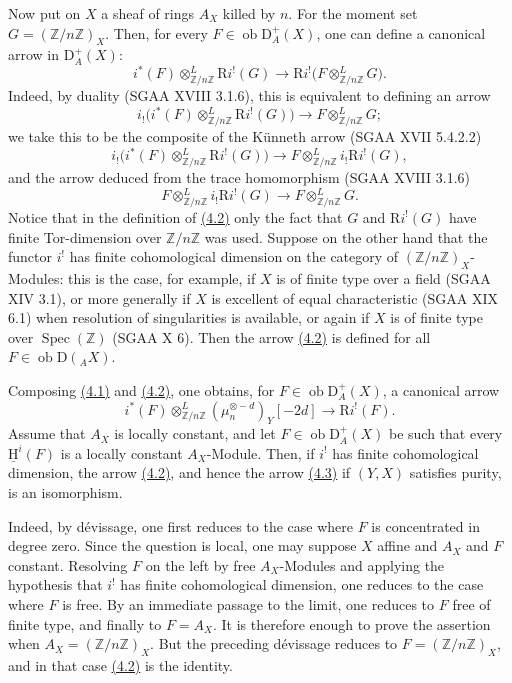 \documentclass[11pt]{article}
\providecommand{\uH}{\underline{\mathrm H}}
\DeclareMathOperator{\Spec}{Spec}
\newcommand{\R}{\mathrm{R}}
\newcommand{\D}{\mathrm{D}}
\newcommand{\Z}{\mathbb{Z}}
\newcommand{\ob}{\operatorname{ob}}
\providecommand{\ob}{\operatorname{ob}}
\providecommand{\R}{\mathrm R}
\providecommand{\Z}{\mathbb Z}
\providecommand{\Spec}{\operatorname{Spec}}
\providecommand{\Spec}{\operatorname{Spec}}
\providecommand{\Spec}{\operatorname{Spec}}
\providecommand{\Spec}{\operatorname{Spec}}
\begin{document}
Now put on $X$ a sheaf of rings $A_X$ killed by $n$. For the moment set $G=(\Z/n\Z)_X$. Then, for every $F\in\ob\D_A^+(X)$, one can define a canonical arrow in $\D_A^+(X)$:
\begin{equation}\tag{4.2}\label{sga5:I:equation:4.2}
        i^*(F)\otimes^L_{\Z/n\Z} \R i^!(G)\longrightarrow \R i^!\bigl(F\otimes^L_{\Z/n\Z}G\bigr).
\end{equation}
Indeed, by duality (SGAA XVIII 3.1.6), this is equivalent to defining an arrow
\[
        i_!\bigl(i^*(F)\otimes^L_{\Z/n\Z}\R i^!(G)\bigr)\longrightarrow F\otimes^L_{\Z/n\Z}G;
\]
we take this to be the composite of the Künneth arrow (SGAA XVII 5.4.2.2)
\[
        i_!\bigl(i^*(F)\otimes^L_{\Z/n\Z}\R i^!(G)\bigr)\longrightarrow F\otimes^L_{\Z/n\Z}i_!\R i^!(G),
\]
and the arrow deduced from the trace homomorphism (SGAA XVIII 3.1.6)
\[
        F\otimes^L_{\Z/n\Z}i_!\R i^!(G)\longrightarrow F\otimes^L_{\Z/n\Z}G.
\]
Notice that in the definition of \hyperref[sga5:I:equation:4.2]{(4.2)} only the fact that $G$ and $\R i^!(G)$ have finite Tor-dimension over $\Z/n\Z$ was used. Suppose on the other hand that the functor $i^!$ has finite cohomological dimension on the category of $(\Z/n\Z)_X$-Modules: this is the case, for example, if $X$ is of finite type over a field (SGAA XIV 3.1), or more generally if $X$ is excellent of equal characteristic (SGAA XIX 6.1) when resolution of singularities is available, or again if $X$ is of finite type over $\Spec(\Z)$ (SGAA X 6). Then the arrow \hyperref[sga5:I:equation:4.2]{(4.2)} is defined for all $F\in\ob\D({}_A X)$.

Composing \hyperref[sga5:I:equation:4.1]{(4.1)} and \hyperref[sga5:I:equation:4.2]{(4.2)}, one obtains, for $F\in\ob\D_A^+(X)$, a canonical arrow
\begin{equation}\tag{4.3}\label{sga5:I:equation:4.3}
        i^*(F)\otimes^L_{\Z/n\Z}(\mu_n^{\otimes -d})_Y[-2d]\longrightarrow \R i^!(F).
\end{equation}
Assume that $A_X$ is locally constant, and let $F\in\ob\D_A^+(X)$ be such that every $\uH^i(F)$ is a locally constant $A_X$-Module. Then, if $i^!$ has finite cohomological dimension, the arrow \hyperref[sga5:I:equation:4.2]{(4.2)}, and hence the arrow \hyperref[sga5:I:equation:4.3]{(4.3)} if $(Y,X)$ satisfies purity, is an isomorphism.

Indeed, by dévissage, one first reduces to the case where $F$ is concentrated in degree zero. Since the question is local, one may suppose $X$ affine and $A_X$ and $F$ constant. Resolving $F$ on the left by free $A_X$-Modules and applying the hypothesis that $i^!$ has finite cohomological dimension, one reduces to the case where $F$ is free. By an immediate passage to the limit, one reduces to $F$ free of finite type, and finally to $F=A_X$. It is therefore enough to prove the assertion when $A_X=(\Z/n\Z)_X$. But the preceding dévissage reduces to $F=(\Z/n\Z)_X$, and in that case \hyperref[sga5:I:equation:4.2]{(4.2)} is the identity.
\end{document}
